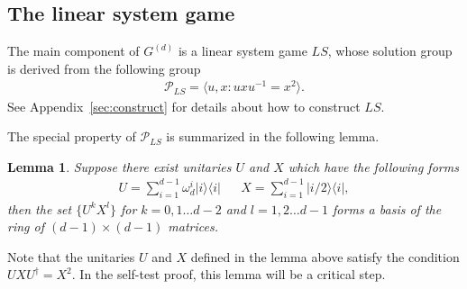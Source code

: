\documentclass[11pt,letterpaper]{article}
\newcommand{\ketbra}[2]{|#1\rangle\langle#2|}
\newcommand{\1}{\mathbb{1}}
\newcommand{\Pg}{\mathcal{P}}
\newcommand{\G}[1]{G^{(#1)}}
\newcommand{\LS}{LS}
\newtheorem{lemma}[theorem]{Lemma}
\theoremstyle{definition}
\begin{document}
\subsection{The linear system game}
The main component of $\G{d}$ is a linear system game $\LS$, whose solution group is derived from the 
following group
\begin{align}
	\Pg_{\LS} = \langle u, x : uxu^{-1} = x^2 \rangle.
\end{align}
See Appendix~\ref{sec:construct} for details about how to construct $\LS$.

The special property of $\Pg_{\LS}$ is summarized in the following lemma. 
\begin{lemma}
	\label{lm:ux_independ}
	Suppose there exist unitaries $U$ and $X$ which have the following forms
	\begin{align}
		U = \sum_{i=1}^{d-1} \omega_d^i \ketbra{i}{i} && X = \sum_{i=1}^{d-1}\ketbra{i/2}{i},
	\end{align}
	then the set $\{U^k X^l\}$ for $k=0,1\dots d-2$ and $l = 1,2\dots d-1$ forms a basis of 
	the ring of $(d-1)\times (d-1)$ matrices.
\end{lemma}
Note that the unitaries $U$ and $X$ defined in the lemma above satisfy the condition $UXU^\dagger = X^2$.
In the self-test proof, this lemma will be a critical step.
\end{document}
